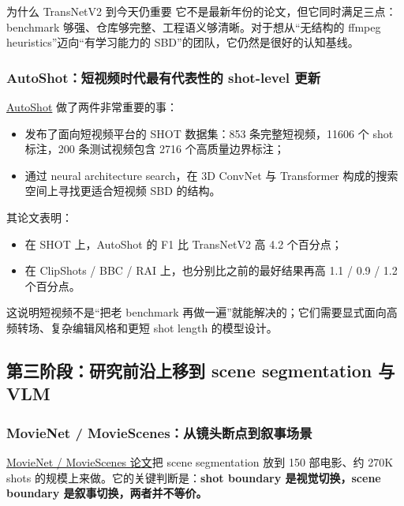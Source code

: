 \documentclass[a4paper]{article}
\begin{document}
\begin{evidencebox}{为什么 TransNetV2 到今天仍重要}
它不是最新年份的论文，但它同时满足三点：benchmark 够强、仓库够完整、工程语义够清晰。对于想从“无结构的 ffmpeg heuristics”迈向“有学习能力的 SBD”的团队，它仍然是很好的认知基线。
\end{evidencebox}

\subsubsection{AutoShot：短视频时代最有代表性的 shot-level 更新}

\href{https://arxiv.org/abs/2304.06116}{AutoShot} 做了两件非常重要的事：

\begin{itemize}
\item 发布了面向短视频平台的 SHOT 数据集：853 条完整短视频，11606 个 shot 标注，200 条测试视频包含 2716 个高质量边界标注；
\item 通过 neural architecture search，在 3D ConvNet 与 Transformer 构成的搜索空间上寻找更适合短视频 SBD 的结构。
\end{itemize}

其论文表明：

\begin{itemize}
\item 在 SHOT 上，AutoShot 的 F1 比 TransNetV2 高 4.2 个百分点；
\item 在 ClipShots / BBC / RAI 上，也分别比之前的最好结果再高 1.1 / 0.9 / 1.2 个百分点。
\end{itemize}

这说明短视频不是“把老 benchmark 再做一遍”就能解决的；它们需要显式面向高频转场、复杂编辑风格和更短 shot length 的模型设计。

\subsection{第三阶段：研究前沿上移到 scene segmentation 与 VLM}

\subsubsection{MovieNet / MovieScenes：从镜头断点到叙事场景}

\href{https://arxiv.org/abs/2004.02678}{MovieNet / MovieScenes 论文}把 scene segmentation 放到 150 部电影、约 270K shots 的规模上来做。它的关键判断是：\textbf{shot boundary 是视觉切换，scene boundary 是叙事切换，两者并不等价。}
\end{document}
